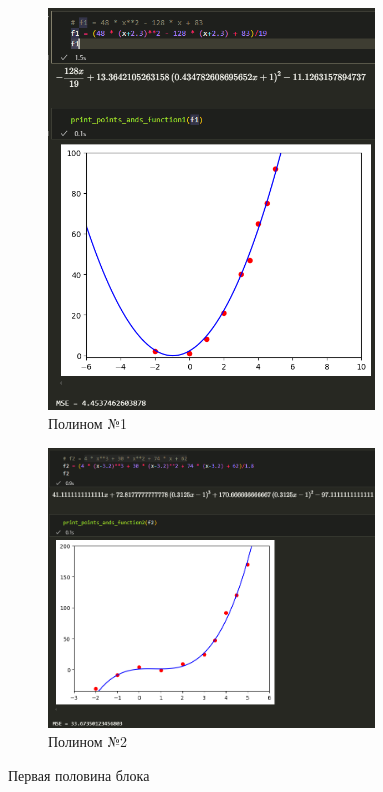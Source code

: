 \documentclass[14pt,a4paper]{extarticle}
\begin{document}
\begin{figure}[ht!]
    \begin{subfigure}{.5\textwidth}
        \centering
        \includegraphics[width=0.95\textwidth]{figures/3.4 1.png}
        \caption{Полином №1}
        \label{fig:3.4-1}
    \end{subfigure}%
    \begin{subfigure}{.5\textwidth}
        \centering
        \includegraphics[width=0.95\textwidth]{figures/3.4 2.png}
        \caption{Полином №2}
        \label{fig:3.4-2}
    \end{subfigure}%
    \caption{Первая половина блока}
    \label{fig:3.4block2-1}
\end{figure}
\end{document}
